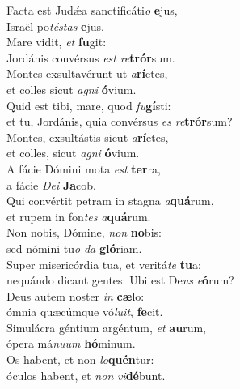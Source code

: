 \evenverse Facta est Judǽa sanctificáti\textit{o} \textbf{e}jus,~\*\\
\evenverse Israël po\textit{té}\textit{stas} \textbf{e}jus.\\
\oddverse Mare vidit, \textit{et} \textbf{fu}git:~\*\\
\oddverse Jordánis convérsus \textit{est} \textit{re}\textbf{trór}sum.\\
\evenverse Montes exsultavérunt ut \textit{a}\textbf{rí}etes,~\*\\
\evenverse et colles sicut \textit{a}\textit{gni} \textbf{ó}vium.\\
\oddverse Quid est tibi, mare, quod \textit{fu}\textbf{gí}sti:~\*\\
\oddverse et tu, Jordánis, quia convérsus \textit{es} \textit{re}\textbf{trór}sum?\\
\evenverse Montes, exsultástis sicut \textit{a}\textbf{rí}etes,~\*\\
\evenverse et colles, sicut \textit{a}\textit{gni} \textbf{ó}vium.\\
\oddverse A fácie Dómini mota \textit{est} \textbf{ter}ra,~\*\\
\oddverse a fácie \textit{De}\textit{i} \textbf{Ja}cob.\\
\evenverse Qui convértit petram in stagna \textit{a}\textbf{quá}rum,~\*\\
\evenverse et rupem in fon\textit{tes} \textit{a}\textbf{quá}rum.\\
\oddverse Non nobis, Dómine, \textit{non} \textbf{no}bis:~\*\\
\oddverse sed nómini tu\textit{o} \textit{da} \textbf{gló}riam.\\
\evenverse Super misericórdia tua, et veritá\textit{te} \textbf{tu}a:~\*\\
\evenverse nequándo dicant gentes: Ubi est De\textit{us} \textit{e}\textbf{ó}rum?\\
\oddverse Deus autem noster \textit{in} \textbf{cæ}lo:~\*\\
\oddverse ómnia quæcúmque vó\textit{lu}\textit{it}, \textbf{fe}cit.\\
\evenverse Simulácra géntium argéntum, \textit{et} \textbf{au}rum,~\*\\
\evenverse ópera má\textit{nu}\textit{um} \textbf{hó}minum.\\
\oddverse Os habent, et non \textit{lo}\textbf{quén}tur:~\*\\
\oddverse óculos habent, et \textit{non} \textit{vi}\textbf{dé}bunt.\\

